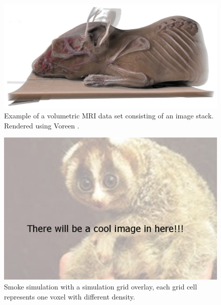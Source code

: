 \begin{itemize}
\begin{minipage}{\linewidth}
      \begin{minipage}{0.45\linewidth}
          \begin{figure}[H]
              \includegraphics[width=\linewidth]{images/volumerat}
              \captionsetup{width=\linewidth}
              \caption[Volumetric image data example, source \cite{RDR10}.]{Example of a volumetric MRI data set consisting of an image stack. Rendered using Voreen  \cite{RDR10}.}\label{fig:RAT}
          \end{figure}
      \end{minipage}
      \hspace{0.05\linewidth}
      \begin{minipage}{0.45\linewidth}
          \begin{figure}[H]
              \includegraphics[width=\linewidth]{images/temp}
              \captionsetup{width=\linewidth}
              \caption[Smoke simulation on regular 3D grid.]{Smoke simulation with a simulation grid overlay, each grid cell represents one voxel with different density\footnotemark[1]. }\label{fig:SIMGRID}
          \end{figure}
      \end{minipage}
  \end{minipage}



\end{itemize}




